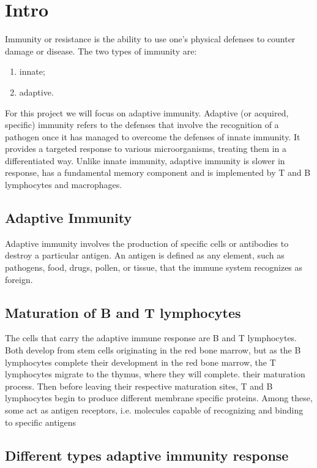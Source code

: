 \section{Intro}

Immunity or resistance is the ability to use one's physical defenses to counter damage or disease. The two types of immunity are: 

\begin{enumerate}
    \item innate;
    \item adaptive.
\end{enumerate}

For this project we will focus on adaptive immunity. Adaptive (or acquired, specific) immunity refers to the defenses that involve the recognition of a pathogen once it has managed to overcome the defenses of innate immunity. It provides a targeted response to various microorganisms, treating them in a differentiated way. Unlike innate immunity, adaptive immunity is slower in response, has a fundamental memory component and is implemented by T and B lymphocytes and macrophages.

\subsection{Adaptive Immunity}
Adaptive immunity involves the production of specific cells or antibodies to destroy a particular antigen. An antigen is defined as any element, such as pathogens, food, drugs, pollen, or tissue, that the immune system recognizes as foreign.

\subsection{Maturation of B and T lymphocytes}
The cells that carry the adaptive immune response are B and T lymphocytes. Both develop from stem cells originating in the red bone marrow, but as the B lymphocytes complete their development in the red bone marrow, the T lymphocytes migrate to the thymus, where they will complete. their maturation process. Then before leaving their respective maturation sites, T and B lymphocytes begin to produce different membrane specific proteins. Among these, some act as antigen receptors, i.e. molecules capable of recognizing and binding to specific antigens

\subsection{Different types adaptive immunity response}

